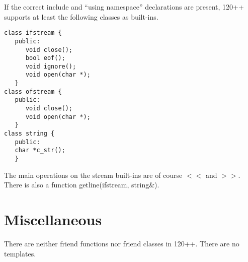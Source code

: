 If the correct include and ``using namespace'' declarations are
present, 120++ supports at least the following classes as built-ins.

\begin{verbatim}
class ifstream {
   public:
      void close();
      bool eof();
      void ignore();
      void open(char *);
   }
class ofstream {
   public:
      void close();
      void open(char *);
   }
class string {
   public:
   char *c_str();
   }
\end{verbatim}

The main operations on the stream built-ins are of course $<<$ and $>>$.
There is also a function getline(ifstream, string\&).

\section{Miscellaneous}

There are neither friend functions nor friend classes in 120++.
There are no templates.

